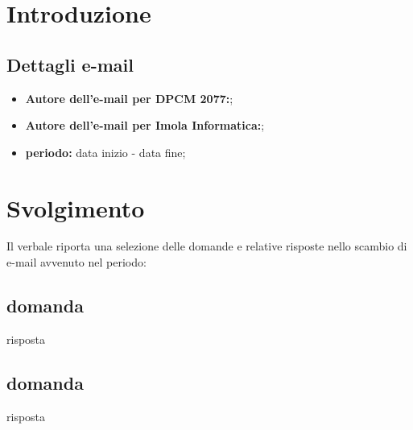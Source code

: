 \section*{Introduzione}
\subsection*{Dettagli e-mail}
\begin{itemize}
	\item \textbf{Autore dell'e-mail per DPCM 2077:};
	\item \textbf{Autore dell'e-mail per Imola Informatica:};
	\item \textbf{periodo:} data inizio - data fine;
\end{itemize}

\section*{Svolgimento}
Il verbale riporta una selezione delle domande e relative risposte nello scambio di e-mail avvenuto nel periodo: %
\subsection*{domanda}
risposta
\subsection*{domanda}
risposta